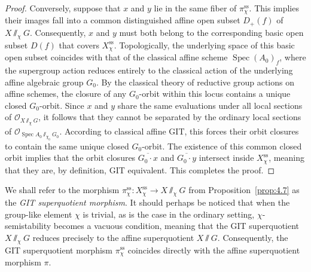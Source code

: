 \documentclass[11pt,a4paper,reqno,noamsfonts]{amsart}
\numberwithin{equation}{section}
\theoremstyle{definition}
\theoremstyle{remark}
\newcommand{\Ocal}{\ensuremath{\mathscr{O}}}
\newcommand{\uss}{\ensuremath{\mathrm{ss}}}
\DeclareMathOperator{\Spec}{Spec}
\begin{document}
\begin{proof}
Conversely, suppose that $x$ and $y$ lie in the same fiber of $\pi^{\uss}_{\chi}$. This implies their images fall into a common distinguished affine open subset $D_+(f)$ of  $X {\sslash_{\chi}} G$. Consequently, $x$ and $y$ must both belong to the corresponding basic open subset $D(f)$ that covers $X_{\chi }^{\uss}$. Topologically, the underlying space of this basic open subset coincides with that of the classical affine scheme $\Spec (A_0)_f$, where the supergroup action reduces entirely to the classical action of the underlying affine algebraic group $G_{0}$. By the classical theory of reductive group actions on affine schemes, the closure of any $G_{0}$-orbit within this locus contains a unique closed $G_{0}$-orbit. Since $x$ and $y$ share the same evaluations under all local sections of $\Ocal_{X {\sslash_{\chi}} G}$, it follows that they cannot be separated by the ordinary local sections of $\Ocal_{\Spec A_0 {\sslash_{\chi_0}} G_{0}}$. According to classical affine GIT, this forces their orbit closures to contain the same unique closed $G_0$-orbit. The existence of this common closed orbit implies that the orbit closures $\overline{G_{0}\cdot x}$ and $\overline{G_{0}\cdot y}$ intersect inside $X_{\chi }^{\uss}$, meaning that they are, by definition, GIT equivalent. This completes the proof.
\end{proof}

We shall refer to the morphism $\pi^{\uss}_{\chi} \colon X^{\uss}_{\chi} \to X {\sslash_{\chi}} G$ from Proposition~\ref{prop:4.7} as the \emph{GIT superquotient morphism}. It should perhaps be noticed that when the group-like element $\chi$ is trivial, as is the case in the ordinary setting, $\chi$-semistability becomes a vacuous condition, meaning that the GIT superquotient $X {\sslash_{\chi}} G$ reduces precisely to the affine superquotient $X {\sslash} G$. Consequently, the GIT superquotient morphism $\pi^{\uss}_{\chi}$ coincides directly with the affine superquotient morphism $\pi$.
\end{document}
